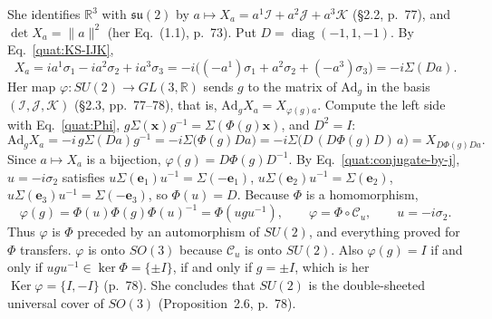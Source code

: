 She identifies $\mathbb R^3$ with $\mathfrak{su}(2)$ by
$a\mapsto X_a=a^1\mathcal I+a^2\mathcal J+a^3\mathcal K$ (\S2.2, p.~77), and
$\det X_a=\|a\|^2$ (her Eq.~(1.1), p.~73). Put
$D=\operatorname{diag}(-1,1,-1)$. By Eq.~\eqref{quat:KS-IJK},
\begin{equation}\label{quat:KS-Xa}
 X_a=i a^1\sigma_1-i a^2\sigma_2+i a^3\sigma_3
 =-i\bigl((-a^1)\sigma_1+a^2\sigma_2+(-a^3)\sigma_3\bigr)
 =-i\Sigma(Da).
\end{equation}
Her map $\varphi\colon SU(2)\to GL(3,\mathbb R)$ sends $g$ to the matrix of
$\mathrm{Ad}_g$ in the basis $(\mathcal I,\mathcal J,\mathcal K)$
(\S2.3, pp.~77--78), that is, $\mathrm{Ad}_gX_a=X_{\varphi(g)a}$. Compute the
left side with Eq.~\eqref{quat:Phi}, $g\Sigma(\mathbf x)g^{-1}=\Sigma(\Phi(g)\mathbf x)$,
and $D^2=I$:
\begin{equation}
 \mathrm{Ad}_gX_a=-i\,g\Sigma(Da)g^{-1}=-i\Sigma\bigl(\Phi(g)Da\bigr)
 =-i\Sigma\bigl(D\,(D\Phi(g)D)\,a\bigr)=X_{D\Phi(g)Da}.
\end{equation}
Since $a\mapsto X_a$ is a bijection, $\varphi(g)=D\Phi(g)D^{-1}$. By
Eq.~\eqref{quat:conjugate-by-j}, $u=-i\sigma_2$ satisfies
$u\Sigma(\mathbf e_1)u^{-1}=\Sigma(-\mathbf e_1)$,
$u\Sigma(\mathbf e_2)u^{-1}=\Sigma(\mathbf e_2)$,
$u\Sigma(\mathbf e_3)u^{-1}=\Sigma(-\mathbf e_3)$, so $\Phi(u)=D$. Because
$\Phi$ is a homomorphism,
\begin{equation}\label{quat:KS-phi}
 \varphi(g)=\Phi(u)\Phi(g)\Phi(u)^{-1}=\Phi(ugu^{-1}),\qquad
 \varphi=\Phi\circ\mathcal C_u,\qquad u=-i\sigma_2 .
\end{equation}
Thus $\varphi$ is $\Phi$ preceded by an automorphism of $SU(2)$, and
everything proved for $\Phi$ transfers. $\varphi$ is onto $SO(3)$ because
$\mathcal C_u$ is onto $SU(2)$. Also $\varphi(g)=I$ if and only if
$ugu^{-1}\in\ker\Phi=\{\pm I\}$, if and only if $g=\pm I$, which is her
$\operatorname{Ker}\varphi=\{I,-I\}$ (p.~78). She concludes that $SU(2)$
is the double-sheeted universal cover of $SO(3)$ (Proposition~2.6, p.~78).

